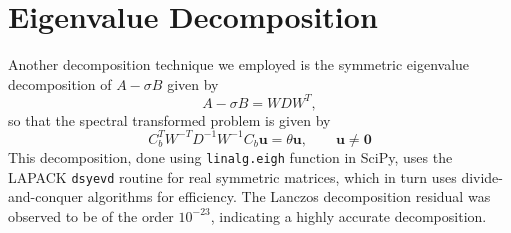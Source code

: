 \section{Eigenvalue Decomposition}
Another decomposition technique we employed is the symmetric eigenvalue decomposition of $A-\sigma B$ given by
\begin{equation}
    A-\sigma B = WDW^T,
\end{equation}
so that the spectral transformed problem is given by
\begin{equation}\label{3.4}
	C_b^T W^{-T}D^{-1}W^{-1} C_b \mathbf{u} = \theta \mathbf{u}, \qquad \mathbf{u} \neq \mathbf{0}
\end{equation}
This decomposition, done using \texttt{linalg.eigh} function in SciPy, uses the LAPACK \texttt{dsyevd} routine for real symmetric matrices, which in turn uses divide-and-conquer algorithms for efficiency. The Lanczos decomposition residual was observed to be of the order $10^{-23}$, indicating a highly accurate decomposition.\\

